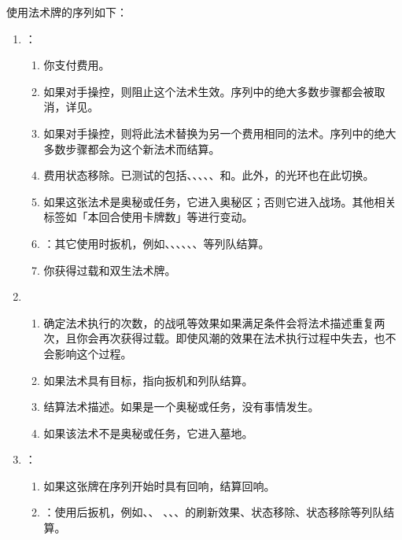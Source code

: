 使用法术牌的序列如下：
\begin{enumerate}
    \item {}：
    \begin{enumerate}
        \item 你支付费用。
        \item 如果对手操控，则阻止这个法术生效。序列中的绝大多数步骤都会被取消，详见。
        \item 如果对手操控，则将此法术替换为另一个费用相同的法术。序列中的绝大多数步骤都会为这个新法术而结算。
        \item 费用状态移除。已测试的包括、、、、、和。此外，的光环也在此切换。
        \item 如果这张法术是奥秘或任务，它进入奥秘区；否则它进入战场。其他相关标签如「本回合使用卡牌数」等进行变动。
        \item {}：其它使用时扳机，例如、、、、、、等列队结算。
        \item 你获得过载和双生法术牌。
    \end{enumerate}

    \item {}
    \begin{enumerate}
        \item 确定法术执行的次数，的战吼等效果如果满足条件会将法术描述重复两次，且你会再次获得过载。即使风潮的效果在法术执行过程中失去，也不会影响这个过程。
        \item 如果法术具有目标，指向扳机和列队结算。
        \item 结算法术描述。如果是一个奥秘或任务，没有事情发生。
        \item 如果该法术不是奥秘或任务，它进入墓地。
    \end{enumerate}

    \item {}：
    \begin{enumerate}
        \item 如果这张牌在序列开始时具有回响，结算回响。
        \item {}：使用后扳机，例如、、 、、、的刷新效果、状态移除、状态移除等列队结算。
    \end{enumerate}
\end{enumerate}

